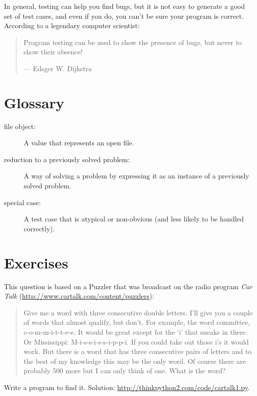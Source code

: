 \documentclass[
DIV=11,
fontsize=12,
twoside,
headinclude=false,
titlepage=firstiscover,
abstract=true,
headsepline=true,
footsepline=true,
chapterprefix=true, %
headings=big,
bibliography=totoc,%
captions=tableheading
]{scrbook}
\theoremstyle{definition}
\begin{document}
In general, testing can help you find bugs, but it is not easy to
generate a good set of test cases, and even if you do, you can't
be sure your program is correct.
According to a legendary computer scientist:

\begin{quote}
Program testing can be used to show the presence of bugs, but never to
show their absence!

--- Edsger W. Dijkstra
\end{quote}


\section{Glossary}

\begin{description}

\item[file object:] A value that represents an open file.

\item[reduction to a previously solved problem:] A way of solving a
  problem by expressing it as an instance of a previously solved
  problem.  

\item[special case:] A test case that is atypical or non-obvious
(and less likely to be handled correctly).

\end{description}


\section{Exercises}

\begin{exercise}
\normalfont
{}

This question is based on a Puzzler that was broadcast on the radio
program {\em Car Talk} 
(\url{http://www.cartalk.com/content/puzzlers}):

\begin{quote}
Give me a word with three consecutive double letters. I'll give you a
couple of words that almost qualify, but don't. For example, the word
committee, c-o-m-m-i-t-t-e-e. It would be great except for the `i' that
sneaks in there. Or Mississippi: M-i-s-s-i-s-s-i-p-p-i. If you could
take out those i's it would work. But there is a word that has three
consecutive pairs of letters and to the best of my knowledge this may
be the only word. Of course there are probably 500 more but I can only
think of one. What is the word?
\end{quote}

Write a program to find it.
Solution: \url{http://thinkpython2.com/code/cartalk1.py}.

\end{exercise}
\end{document}
